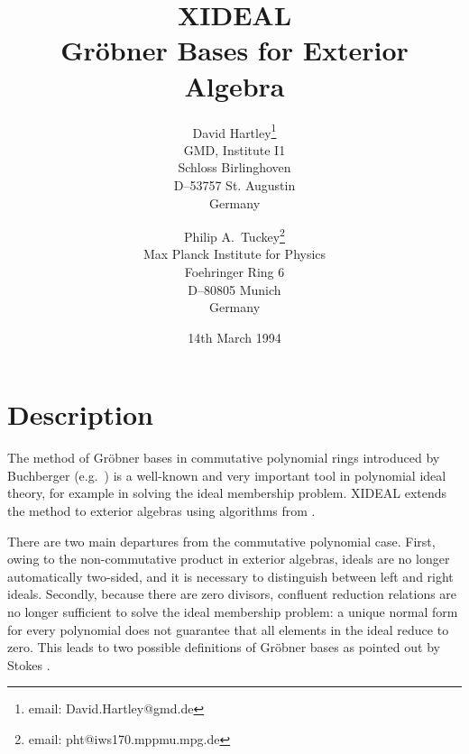 
\title{\bf XIDEAL\\
Gr\"obner Bases for Exterior Algebra}

\author{
David Hartley\thanks{email: David.Hartley@gmd.de}       \\
GMD, Institute I1                                       \\
Schloss Birlinghoven                                    \\
D--53757 St. Augustin                                   \\
Germany                                                 \\
\and
Philip A.~Tuckey\thanks{email: pht@iws170.mppmu.mpg.de} \\
Max Planck Institute for Physics                        \\
Foehringer Ring 6                                       \\
D--80805 Munich                                         \\
Germany                                                 \\
}

\date{14th March 1994}


\maketitle

\section{Description}

The method of Gr\"obner bases in commutative polynomial rings introduced by
Buchberger (e.g.~\cite{Buchberger}) is a well-known and very important tool
in polynomial ideal theory, for example in solving the ideal membership
problem. XIDEAL extends the method to exterior algebras using
algorithms from \cite{HT}.

There are two main departures from the commutative polynomial case. First,
owing to the non-commutative product in exterior algebras, ideals are no
longer automatically two-sided, and it is necessary to distinguish between
left and right ideals. Secondly, because there are zero divisors, confluent
reduction relations are no longer sufficient to solve the ideal membership
problem: a unique normal form for every polynomial does not guarantee that
all elements in the ideal reduce to zero. This leads to two possible
definitions of Gr\"obner bases as pointed out by Stokes \cite{Stokes}.


